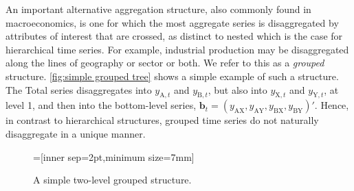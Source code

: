 \documentclass[a4paper, 11pt]{article}
\begin{document}
An important alternative aggregation structure, also commonly found in macroeconomics, is one for which the most aggregate series is disaggregated by attributes of interest that are crossed, as distinct to nested which is the case for hierarchical time series. For example, industrial production may be disaggregated along the lines of geography or sector or both. We refer to this as a \textit{grouped} structure. \autoref{fig:simple grouped tree} shows a simple example of such a structure. The Total series disaggregates into $y_{\text{A},t}$ and $y_{\text{B},t}$, but also into $y_{\text{X},t}$ and $y_{\text{Y},t}$, at level 1, and then into the bottom-level series, $\bm{b}_t=(y_{\text{AX}}, y_{\text{AY}}, y_{\text{BX}}, y_{\text{BY}})'$. Hence, in contrast to hierarchical structures, grouped time series do not naturally disaggregate in a unique manner.

\begin{figure}[!hbt]\centering
	=[inner sep=2pt,minimum size=7mm]
	\caption{A simple two-level grouped structure.}
	\label{fig:simple grouped tree}
\end{figure}
\end{document}
